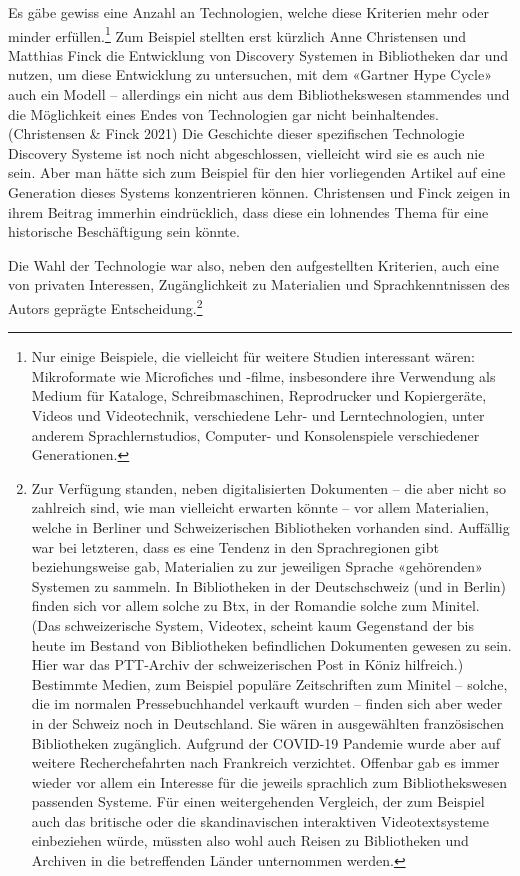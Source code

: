 \documentclass[a4paper,
fontsize=11pt,
oneside,
numbers=noperiodatend,
parskip=half-,
bibliography=totoc,
final
]{scrartcl}
\begin{document}
Es gäbe gewiss eine Anzahl an Technologien, welche diese Kriterien mehr
oder minder erfüllen.\footnote{Nur einige Beispiele, die vielleicht für
  weitere Studien interessant wären: Mikroformate wie Microfiches und
  -filme, insbesondere ihre Verwendung als Medium für Kataloge,
  Schreibmaschinen, Reprodrucker und Kopiergeräte, Videos und
  Videotechnik, verschiedene Lehr- und Lerntechnologien, unter anderem
  Sprachlernstudios, Computer- und Konsolenspiele verschiedener
  Generationen.} Zum Beispiel stellten erst kürzlich Anne Christensen
und Matthias Finck die Entwicklung von Discovery Systemen in
Bibliotheken dar und nutzen, um diese Entwicklung zu untersuchen, mit
dem «Gartner Hype Cycle» auch ein Modell -- allerdings ein nicht aus dem
Bibliothekswesen stammendes und die Möglichkeit eines Endes von
Technologien gar nicht beinhaltendes. (Christensen \& Finck 2021) Die
Geschichte dieser spezifischen Technologie Discovery Systeme ist noch
nicht abgeschlossen, vielleicht wird sie es auch nie sein. Aber man
hätte sich zum Beispiel für den hier vorliegenden Artikel auf eine
Generation dieses Systems konzentrieren können. Christensen und Finck
zeigen in ihrem Beitrag immerhin eindrücklich, dass diese ein lohnendes
Thema für eine historische Beschäftigung sein könnte.

Die Wahl der Technologie war also, neben den aufgestellten Kriterien,
auch eine von privaten Interessen, Zugänglichkeit zu Materialien und
Sprachkenntnissen des Autors geprägte Entscheidung.\footnote{Zur
  Verfügung standen, neben digitalisierten Dokumenten -- die aber nicht
  so zahlreich sind, wie man vielleicht erwarten könnte -- vor allem
  Materialien, welche in Berliner und Schweizerischen Bibliotheken
  vorhanden sind. Auffällig war bei letzteren, dass es eine Tendenz in
  den Sprachregionen gibt beziehungsweise gab, Materialien zu zur
  jeweiligen Sprache «gehörenden» Systemen zu sammeln. In Bibliotheken
  in der Deutschschweiz (und in Berlin) finden sich vor allem solche zu
  Btx, in der Romandie solche zum Minitel. (Das schweizerische System,
  Videotex, scheint kaum Gegenstand der bis heute im Bestand von
  Bibliotheken befindlichen Dokumenten gewesen zu sein. Hier war das
  PTT-Archiv der schweizerischen Post in Köniz hilfreich.) Bestimmte
  Medien, zum Beispiel populäre Zeitschriften zum Minitel -- solche, die
  im normalen Pressebuchhandel verkauft wurden -- finden sich aber weder
  in der Schweiz noch in Deutschland. Sie wären in ausgewählten
  französischen Bibliotheken zugänglich. Aufgrund der COVID-19 Pandemie
  wurde aber auf weitere Recherchefahrten nach Frankreich verzichtet.
  Offenbar gab es immer wieder vor allem ein Interesse für die jeweils
  sprachlich zum Bibliothekswesen passenden Systeme. Für einen
  weitergehenden Vergleich, der zum Beispiel auch das britische oder die
  skandinavischen interaktiven Videotextsysteme einbeziehen würde,
  müssten also wohl auch Reisen zu Bibliotheken und Archiven in die
  betreffenden Länder unternommen werden.}
\end{document}
